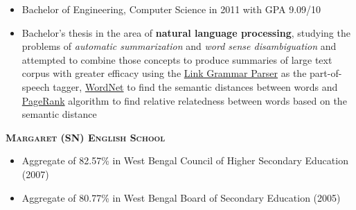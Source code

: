 \documentclass{article}
\begin{document}
\begin{itemize}[noitemsep,nolistsep]
\item Bachelor of Engineering, Computer Science in 2011 with GPA 9.09/10
\item Bachelor’s thesis in the area of \textbf{natural language processing}, studying the problems of \textit{automatic summarization} and \textit{word sense disambiguation} and attempted to combine those concepts to produce summaries of large text corpus with greater efficacy using the \href{https://www.link.cs.cmu.edu/link/}{Link Grammar Parser} as the part-of-speech tagger, \href{https://wordnet.princeton.edu/}{WordNet} to find the semantic distances between words and \href{https://en.wikipedia.org/wiki/PageRank}{PageRank} algorithm to find relative relatedness between words based on the semantic distance
\end{itemize}


{\raggedright{\textsc{\textbf{Margaret (SN) English School}}}} \hfill {}
\begin{itemize}[noitemsep,nolistsep]
\item Aggregate of 82.57\% in West Bengal Council of Higher Secondary Education (2007)
\item Aggregate of 80.77\% in West Bengal Board of Secondary Education (2005)
\end{itemize}
\end{document}
